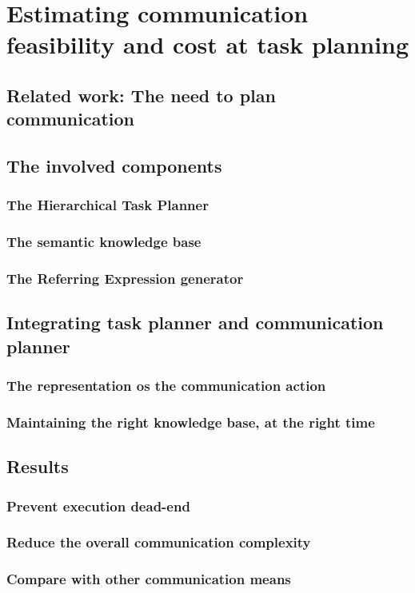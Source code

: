 \ifdefined{}
\else
\setcounter{chapter}{5} %
\dominitoc
\faketableofcontents
\fi

\chapter{Estimating communication feasibility and cost at task planning}
\minitoc

\section{Related work: The need to plan communication}


\section{The involved components}

\subsection{The Hierarchical Task Planner}

\subsection{The semantic knowledge base}

\subsection{The Referring Expression generator}


\section{Integrating task planner and communication planner}

\subsection{The representation os the communication action}

\subsection{Maintaining the right knowledge base, at the right time}


\section{Results}

\subsection{Prevent execution dead-end}

\subsection{Reduce the overall communication complexity}

\subsection{Compare with other communication means}
